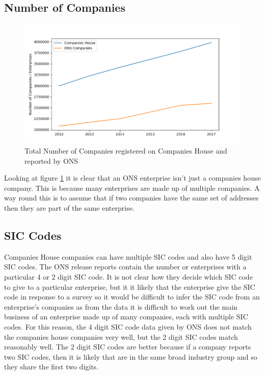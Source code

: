 \documentclass[a4paper,10pt]{article}
\begin{document}
   \subsection{Number of Companies}
   \begin{figure}[h]
      \begin{center}
         \caption{Total Number of Companies registered on Companies House and reported by ONS}
         \label{ch_vs_ons}
         \includegraphics[width=12cm]{graphs/companies_house_vs_ons/companies_house_vs_ons}
      \end{center}
   \end{figure}

   Looking at figure \ref{ch_vs_ons} it is clear that an ONS enterprise isn't just a companies house company. This is because many enterprises are made up of multiple companies. A way round this is to assume that if two companies have the same set of addresses then they are part of the same enterprise.

   \subsection{SIC Codes}

   Companies House companies can have multiple SIC codes and also have 5 digit SIC codes. The ONS release reports contain the number or enterprises with a particular 4 or 2 digit SIC code. It is not clear how they decide which SIC code to give to a particular enterprise, but it it likely that the enterprise give the SIC code in response to a survey so it would be difficult to infer the SIC code from an enterprise's companies as from the data it is difficult to work out the main business of an enterprise made up of many companies, each with multiple SIC codes. For this reason, the 4 digit SIC code data given by ONS does not match the companies house companies very well, but the 2 digit SIC codes match reasonably well. The 2 digit SIC codes are better because if a company reports two SIC codes, then it is likely that are in the same broad industry group and so they share the first two digits.
\end{document}

